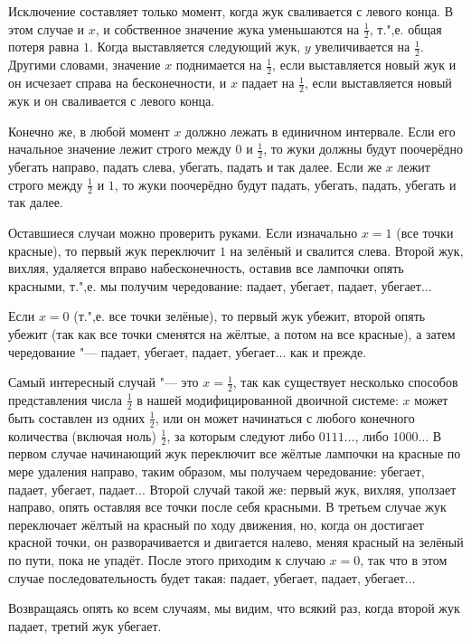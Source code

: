 \documentclass[twoside]{book}
\begin{document}
Исключение составляет только момент, когда жук сваливается с левого конца.
В этом случае и $x$, и собственное значение жука уменьшаются на $\tfrac12$, т.",е. общая потеря равна $1$.
Когда выставляется следующий жук, $y$ увеличивается на $\tfrac12$.
Другими словами, значение $x$ поднимается на $\tfrac12$, если выставляется новый жук и он исчезает справа на бесконечности, и $x$ падает на $\tfrac12$, если выставляется новый жук и он сваливается с левого конца.

Конечно же, в любой момент $x$ должно лежать в единичном интервале.
Если его начальное значение лежит строго между $0$ и $\tfrac12$, то жуки должны будут поочерёдно убегать направо, падать слева, убегать, падать и так далее.
Если же $x$ лежит строго между $\tfrac12$ и $1$, то жуки поочерёдно будут падать, убегать, падать, убегать и так далее.

Оставшиеся случаи можно проверить руками.
Если изначально $x = 1$ (все точки красные), то первый жук переключит $1$ на зелёный и свалится слева.
Второй жук, вихляя, удаляется вправо на\pagebreak[3] бесконечность, оставив все лампочки опять красными, т.",е. мы получим чередование: падает, убегает, падает, убегает...

Если $x = 0$ (т.",е. все точки зелёные), то первый жук убежит, второй опять убежит (так как все точки сменятся на жёлтые, а потом на все красные), а затем чередование "--- падает, убегает, падает, убегает... как и прежде.

Самый интересный случай "--- это $x=\tfrac12$, так как существует несколько способов представления числа $\tfrac12$ в нашей модифицированной двоичной системе: $x$ может быть составлен из одних $\tfrac12$, или он может начинаться с любого конечного количества (включая ноль) $\tfrac12$, за которым следуют либо $0111\dots$, либо $1000\dots$
В первом случае начинающий жук переключит все жёлтые лампочки на красные по мере удаления направо, таким образом, мы получаем чередование: убегает, падает, убегает, падает...
Второй случай такой же: первый жук, вихляя, уползает направо, опять оставляя все точки после себя красными.
В третьем случае жук переключает жёлтый на красный по ходу движения, но, когда он достигает красной точки, он разворачивается и двигается налево, меняя красный на зелёный по пути, пока не упадёт.
После этого приходим к случаю $x = 0$, так что в этом случае  последовательность будет такая: падает, убегает, падает, убегает...

Возвращаясь опять ко всем случаям, мы видим, что всякий раз, когда второй жук падает, третий жук убегает.
\heart
\end{document}
